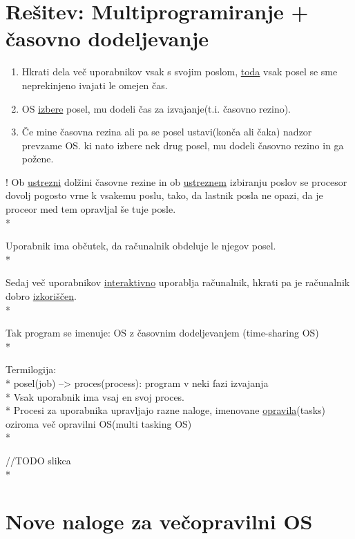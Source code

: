 \documentclass[
  slovene,
  a4paper
]{book}
\begin{document}
\section{Rešitev: Multiprogramiranje + časovno dodeljevanje}

\begin{enumerate}
  \item Hkrati dela več uporabnikov vsak s svojim poslom, \underline{toda} vsak posel se sme neprekinjeno ivajati le omejen čas.
  \item OS \underline{izbere} posel, mu dodeli čas za izvajanje(t.i. časovno rezino).
  \item Če mine časovna rezina ali pa se posel ustavi(konča ali čaka) nadzor prevzame OS. ki nato izbere nek drug posel, mu dodeli časovno rezino in ga požene.
\end{enumerate}

! Ob \underline{ustrezni} dolžini časovne rezine in ob \underline{ustreznem} izbiranju poslov se procesor dovolj pogosto vrne k vsakemu poslu, tako, da lastnik posla ne opazi, da je proceor med tem opravljal še tuje posle.\\*

Uporabnik ima občutek, da računalnik obdeluje le njegov posel.\\*

Sedaj več uporabnikov \underline{interaktivno} uporablja računalnik, hkrati pa je računalnik dobro \underline{izkoriščen}.\\*

Tak program se imenuje: OS z časovnim dodeljevanjem (time-sharing OS)\\*

Termilogija:\\*
posel(job) --> proces(process): program v neki fazi izvajanja\\*
Vsak uporabnik ima vsaj en svoj proces.\\*
Procesi za uporabnika upravljajo razne naloge, imenovane \underline{opravila}(tasks) oziroma več opravilni OS(multi tasking OS)\\*

//TODO slikca\\*

\section{Nove naloge za večopravilni OS}
\end{document}
